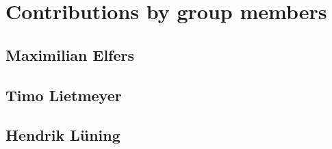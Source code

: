 \chapter{Contributions by group members}
\label{ch:contributions}


\section{Maximilian Elfers}

\section{Timo Lietmeyer}

\section{Hendrik Lüning}
